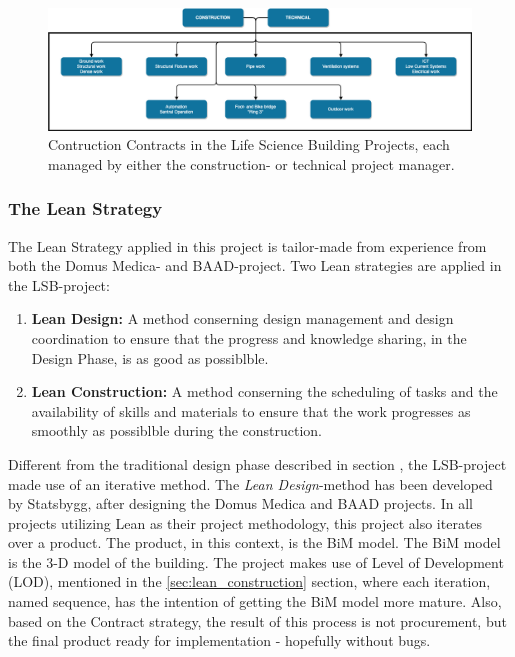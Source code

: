 \begin{figure}
    \centering
    \includegraphics[width=\textwidth]{fig/LVB_contracts.png}
    \caption{Contruction Contracts in the Life Science Building Projects, each managed by either the construction- or technical project manager.}
    \label{fig:project_contracts}
\end{figure}

\subsubsection*{The Lean Strategy}
The Lean Strategy applied in this project is tailor-made from experience from both the Domus Medica- and BAAD-project. Two Lean strategies are applied in the LSB-project: 

\begin{enumerate}
    \item \textbf{Lean Design:} A method conserning design management and design coordination to ensure that the progress and knowledge sharing, in the Design Phase, is as good as possiblble.
    \item \textbf{Lean Construction:} A method conserning the scheduling
    of tasks and the availability of skills and materials to ensure that the work progresses as smoothly as possiblble during the construction.
\end{enumerate}

Different from the traditional design phase described in section , the LSB-project made use of an iterative method. The \textit{Lean Design}-method has been developed by Statsbygg, after designing the Domus Medica and BAAD projects. In all projects utilizing Lean as their project methodology, this project also iterates over a product. The product, in this context, is the BiM model. The BiM model is the 3-D model of the building. The project makes use of Level of Development (LOD), mentioned in the \ref{sec:lean_construction} section, where each iteration, named sequence, has the intention of getting the BiM model more mature. Also, based on the Contract strategy, the result of this process is not procurement, but the final product ready for implementation - hopefully without bugs. 

